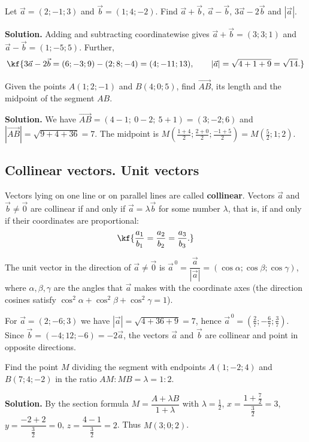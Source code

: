 \begin{misol}
Let $\vec a=(2;-1;3)$ and $\vec b=(1;4;-2)$. Find $\vec a+\vec b$, $\vec a-\vec b$,
$3\vec a-2\vec b$ and $|\vec a|$.

\textbf{Solution.}
Adding and subtracting coordinatewise gives
$\vec a+\vec b=(3;3;1)$ and $\vec a-\vec b=(1;-5;5)$. Further,
\[\kf{3\vec a-2\vec b=(6;-3;9)-(2;8;-4)=(4;-11;13),\qquad
|\vec a|=\sqrt{4+1+9}=\sqrt{14}.}\]
\end{misol}

\begin{misol}
Given the points $A(1;2;-1)$ and $B(4;0;5)$, find $\overrightarrow{AB}$, its
length and the midpoint of the segment $AB$.

\textbf{Solution.} We have $\overrightarrow{AB}=(4-1;\ 0-2;\ 5+1)=(3;-2;6)$
and $|\overrightarrow{AB}|=\sqrt{9+4+36}=7$. The midpoint is
$M\left(\frac{1+4}{2};\frac{2+0}{2};\frac{-1+5}{2}\right)=M\left(\frac52;1;2\right)$.
\end{misol}

\subsection{Collinear vectors. Unit vectors}

\begin{tarif}
Vectors lying on one line or on parallel lines are called
\textbf{collinear}. Vectors $\vec a$ and $\vec b\neq\vec 0$ are collinear
if and only if $\vec a=\lambda\vec b$ for some number $\lambda$, that is,
if and only if their coordinates are proportional:
\[\kf{\frac{a_1}{b_1}=\frac{a_2}{b_2}=\frac{a_3}{b_3}.}\]
\end{tarif}

The unit vector in the direction of $\vec a\neq\vec 0$ is
$\vec a^{\,0}=\dfrac{\vec a}{|\vec a|}=(\cos\alpha;\cos\beta;\cos\gamma)$,
where $\alpha,\beta,\gamma$ are the angles that $\vec a$ makes with the
coordinate axes (the direction cosines satisfy
$\cos^2\alpha+\cos^2\beta+\cos^2\gamma=1$).

\begin{misol}
For $\vec a=(2;-6;3)$ we have $|\vec a|=\sqrt{4+36+9}=7$, hence
$\vec a^{\,0}=\left(\frac27;-\frac67;\frac37\right)$.
Since $\vec b=(-4;12;-6)=-2\vec a$, the vectors $\vec a$ and $\vec b$ are
collinear and point in opposite directions.
\end{misol}

\begin{misol}
Find the point $M$ dividing the segment with endpoints $A(1;-2;4)$ and
$B(7;4;-2)$ in the ratio $AM:MB=\lambda=1:2$.

\textbf{Solution.} By the section formula $M=\dfrac{A+\lambda B}{1+\lambda}$
with $\lambda=\frac12$,
$x=\dfrac{1+\frac72}{\frac32}=3$, $y=\dfrac{-2+2}{\frac32}=0$,
$z=\dfrac{4-1}{\frac32}=2$. Thus $M(3;0;2)$.
\end{misol}

